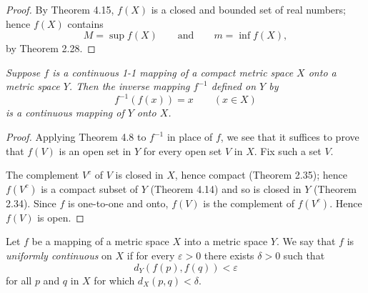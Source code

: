 \begin{proof}
By Theorem 4.15, $f(X)$ is a closed and bounded set of real numbers; hence
$f(X)$ contains
\[ M = \sup f(X) \qquad\text{and}\qquad m = \inf f(X), \]
by Theorem 2.28.
\end{proof}

\emph{Suppose $f$ is a continuous 1-1 mapping of a compact metric space $X$
onto a metric space $Y$. Then the inverse mapping $f^{-1}$ defined on $Y$ by}
\[ f^{-1}(f(x)) = x \qquad (x \in X) \]
\emph{is a continuous mapping of $Y$ onto $X$.}

\begin{proof}
Applying Theorem 4.8 to $f^{-1}$ in place of $f$, we see that it suffices to
prove that $f(V)$ is an open set in $Y$ for every open set $V$ in $X$. Fix
such a set $V$.

The complement $V^c$ of $V$ is closed in $X$, hence compact (Theorem 2.35);
hence $f(V^c)$ is a compact subset of $Y$ (Theorem 4.14) and so is closed in
$Y$ (Theorem 2.34). Since $f$ is one-to-one and onto, $f(V)$ is the
complement of $f(V^c)$. Hence $f(V)$ is open.
\end{proof}

Let $f$ be a mapping of a metric space $X$ into a metric space $Y$. We say
that $f$ is \emph{uniformly continuous} on $X$ if for every $\varepsilon > 0$
there exists $\delta > 0$ such that
\begin{equation}
  d_Y(f(p),f(q)) < \varepsilon \tag{4.15}
\end{equation}
for all $p$ and $q$ in $X$ for which $d_X(p,q) < \delta$.

